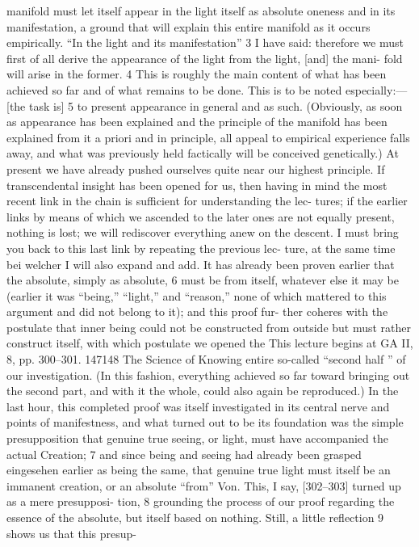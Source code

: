 manifold must let itself appear in the light itself as absolute oneness and in
its manifestation, a ground that will explain this entire manifold as it occurs
empirically. “In the light and its manifestation” 3 I have said: therefore we must
first of all derive the appearance of the light from the light, [and] the mani-
fold will arise in the former. 4 This is roughly the main content of what has
been achieved so far and of what remains to be done. This is to be noted
especially:—[the task is] 5 to present appearance in general and as such.
(Obviously, as soon as appearance has been explained and the principle of the
manifold has been explained from it a priori and in principle, all appeal to
empirical experience falls away, and what was previously held factically will
be conceived genetically.)
At present we have already pushed ourselves quite near our highest
principle. If transcendental insight has been opened for us, then having in
mind the most recent link in the chain is sufficient for understanding the lec-
tures; if the earlier links by means of which we ascended to the later ones are
not equally present, nothing is lost; we will rediscover everything anew on the
descent. I must bring you back to this last link by repeating the previous lec-
ture, at the same time {bei welcher} I will also expand and add. It has already
been proven earlier that the absolute, simply as absolute, 6 must be from itself,
whatever else it may be (earlier it was “being,” “light,” and “reason,” none of
which mattered to this argument and did not belong to it); and this proof fur-
ther coheres with the postulate that inner being could not be constructed from
outside but must rather construct itself, with which postulate we opened the
This lecture begins at GA II, 8, pp. 300–301.
147148
The Science of Knowing
entire so-called “second half ” of our investigation. (In this fashion, everything
achieved so far toward bringing out the second part, and with it the whole,
could also again be reproduced.) In the last hour, this completed proof was
itself investigated in its central nerve and points of manifestness, and what
turned out to be its foundation was the simple presupposition that genuine
true seeing, or light, must have accompanied the actual Creation; 7 and since
being and seeing had already been grasped {eingesehen} earlier as being the
same, that genuine true light must itself be an immanent creation, or an
absolute “from” {Von}. This, I say, [302–303] turned up as a mere presupposi-
tion, 8 grounding the process of our proof regarding the essence of the absolute,
but itself based on nothing. Still, a little reflection 9 shows us that this presup-
